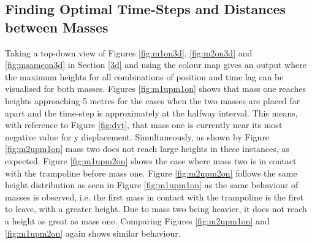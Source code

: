 \subsection{Finding Optimal Time-Steps and Distances between Masses}

\noindent Taking a top-down view of Figures \ref{fig:m1on3d}, \ref{fig:m2on3d} and \ref{fig:msameon3d} in Section \ref{3d} and using the colour map gives an output where the maximum heights for all combinations of position and time lag can be visualised for both masses. Figures \ref{fig:m1upm1on} shows that mass one reaches heights approaching 5 metres for the cases when the two masses are placed far apart and the time-step is approximately at the halfway interval. This means, with reference to Figure \ref{fig:dvt}, that mass one is currently near its most negative value for y displacement.
Simultaneously, as shown by Figure \ref{fig:m2upm1on} mass two does not reach large heights in these instances, as expected. 
\noindent Figure \ref{fig:m1upm2on} shows the case where mass two is in contact with the trampoline before mass one.  Figure \ref{fig:m2upm2on} follows the same height distribution as seen in Figure \ref{fig:m1upm1on} as the same behaviour of masses is observed, i.e. the first mass in contact with the trampoline is the first to leave, with a greater height.  Due to mass two being heavier, it does not reach a height as great as mass one. Comparing Figures \ref{fig:m2upm1on} and \ref{fig:m1upm2on} again shows similar behaviour.

